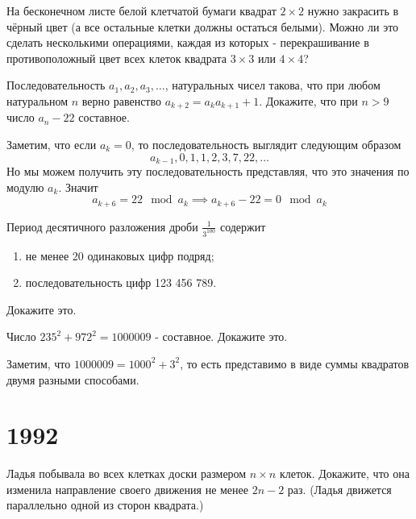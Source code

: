 \documentclass[11pt, a4paper]{problems_template}
\begin{document}
\begin{exercise}[1264]
На бесконечном листе белой клетчатой бумаги квадрат $2 \times 2$ нужно закрасить в чёрный цвет (а все остальные клетки должны остаться белыми). Можно ли это сделать несколькими операциями, каждая из которых - перекрашивание в противоположный цвет всех клеток квадрата $3 \times 3$ или $4 \times 4$?
\end{exercise}

\begin{exercise}[1275]
Последовательность $a_{1}, a_{2}, a_{3}, \dots$, натуральных чисел такова, что при любом натуральном $n$ верно равенство $a_{k+2} = a_{k} a_{k+1} + 1$. Докажите, что при $n > 9$ число $a_{n} - 22$ составное.
\end{exercise}

\begin{Solution}
Заметим, что если $a_{k} = 0$, то последовательность выглядит следующим образом
$$
a_{k-1}, 0, 1, 1, 2, 3, 7, 22, \dots 
$$
Но мы можем получить эту последовательность представляя, что это значения по модулю $a_{k}$. Значит 
$$
a_{k+6} = 22 \mod a_{k} \implies a_{k+6} - 22 = 0 \mod a_{k}
$$
\end{Solution}

\begin{exercise}[1280]
Период десятичного разложения дроби $\frac{1}{3^{100}}$ содержит
\begin{enumerate}
\item не менее 20 одинаковых цифр подряд;
\item последовательность цифр 123 456 789.
\end{enumerate}
Докажите это.
\end{exercise}

\begin{exercise}[1288]
Число $235^{2} + 972^{2} = 1000009$ - составное. Докажите это.
\end{exercise}

\begin{Solution}
Заметим, что $1000009 = 1000^{2} + 3^{2}$, то есть представимо в виде суммы квадратов двумя разными способами.
\end{Solution}

\chapter{1992}

\begin{exercise}[1321]
Ладья побывала во всех клетках доски размером $n \times n$ клеток. Докажите, что она изменила направление своего движения не менее $2n-2$ раз. (Ладья движется параллельно одной из сторон квадрата.)
\end{exercise}
\end{document}
